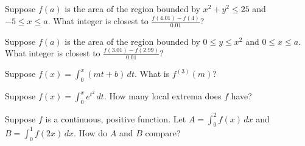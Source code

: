 \documentclass{ximera}
\newcommand{\recommendation}[1]{}
\begin{document}


\begin{problem}
  Suppose $f(a)$ is the area of the region bounded by $x^2 + y^2 \leq 25$ and $-5 \leq x \leq a$.  What integer is closest to $\frac{f(4.01) - f(4)}{0.01}$?
  \begin{multipleChoice}
  \end{multipleChoice}
\end{problem}

\begin{problem}
  Suppose $f(a)$ is the area of the region bounded by $0 \leq y \leq x^2$ and $0 \leq x \leq a$.  What integer is closest to $\frac{f(3.01) - f(2.99)}{0.01}$?
  \begin{multipleChoice}
  \end{multipleChoice}
\end{problem}

\begin{problem}
  Suppose $f(x) = \int_0^x \left( mt + b \right) \, dt$.  What is $f^{(3)}(m)$?
  \begin{multipleChoice}
  \end{multipleChoice}
\end{problem}

\begin{problem}
  Suppose $f(x) = \int_0^x e^{t^2} \, dt$.  How many local extrema does $f$ have?
  \begin{multipleChoice}
  \end{multipleChoice}
\end{problem}



\begin{problem}
  Suppose $f$ is a continuous, positive function.  Let $A = \int_0^2 f(x) \, dx$ and $B = \int_0^1 f(2x) \, dx$.  How do $A$ and $B$ compare?
  \begin{multipleChoice}
  \end{multipleChoice}
\end{problem}
\end{document}
